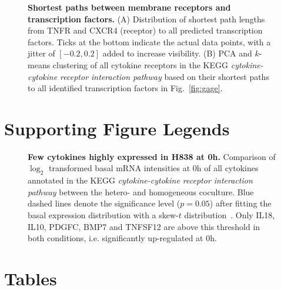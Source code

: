 \begin{figure}[!ht]
\caption{{\bf Shortest paths between membrane receptors and transcription factors.}
(A) Distribution of shortest path lengths from TNFR and CXCR4 (\sdfonea receptor) to 
all predicted transcription factors. Ticks at the bottom indicate the actual data 
points, with a jitter of $[-0.2,0.2]$ added to increase visibility.
(B) PCA and $k$-means clustering of all cytokine 
receptors in the KEGG 
\emph{cytokine-cytokine receptor interaction pathway} based on their shortest paths
to all identified 
transcription factors in Fig.~\ref{fig:gage}.
}
\label{fig:shortest_path}
\end{figure}

\section*{Supporting Figure Legends}

\setcounter{figure}{0}
\makeatletter
\renewcommand{\thefigure}{S\@arabic\c@figure}
\begin{figure}[!ht]
\caption{
{\bf Few cytokines highly expressed in H838 at 0h.}
Comparison of $\log_2$ transformed basal mRNA intensities at 0h of all 
cytokines annotated 
in the KEGG \emph{cytokine-cytokine receptor interaction pathway} between
the hetero- and homogeneous coculture. Blue dashed lines denote the significance
level ($p=0.05$) after fitting the basal expression distribution with a skew-$t$ 
distribution~\cite{Azzalini2003}. Only IL18, IL10, PDGFC,
BMP7 and TNFSF12 are above this threshold in both conditions, 
i.e. significantly up-regulated
at 0h.
}
\label{fig:cytokine_basal}
\end{figure}

\makeatletter
\renewcommand{\thetable}{S\@arabic\c@table}
\section*{Tables}
%

